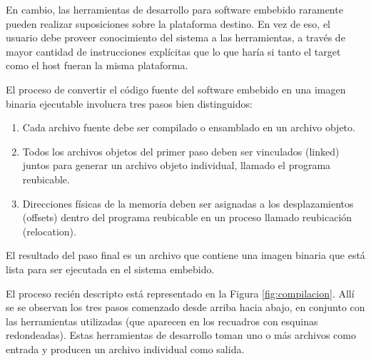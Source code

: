 \documentclass[12pt]{article}
\begin{document}

En cambio, las herramientas de desarrollo para software embebido 
raramente pueden realizar suposiciones sobre la plataforma destino.
En vez de eso, el usuario debe proveer 
conocimiento del sistema a las herramientas, a través 
de mayor cantidad de instrucciones explícitas que lo que haría
si tanto el target como el host fueran la misma plataforma.

El proceso de convertir el código fuente del software embebido
en una imagen binaria ejecutable involucra tres pasos bien distinguidos:

\begin{enumerate}
\item Cada archivo fuente debe ser compilado o ensamblado en un archivo objeto.
\item Todos los archivos objetos del primer paso deben ser vinculados (linked)
juntos para generar un archivo objeto individual, llamado el programa reubicable.
\item Direcciones físicas de la memoria deben ser asignadas a los desplazamientos (offsets)
dentro del programa reubicable en un proceso llamado reubicación (relocation).
\end{enumerate}

El resultado del paso final es un archivo que contiene una imagen binaria
que está lista para ser ejecutada en el sistema embebido.

El proceso recién descripto está representado en la Figura \ref{fig:compilacion}.
Allí se se observan los tres pasos comenzado desde arriba hacia abajo,
en conjunto con las herramientas utilizadas (que aparecen
en los recuadros con esquinas redondeadas).
Estas herramientas de desarrollo toman uno o más archivos como entrada
y producen un archivo individual como salida. 
\end{document}
